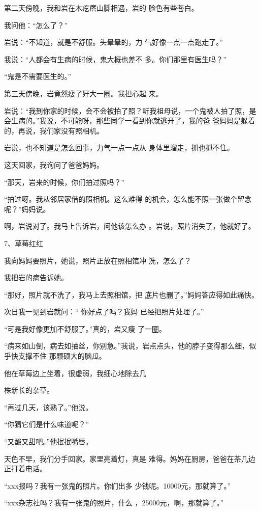 \documentclass{article}
\begin{document}
第二天傍晚，我和岩在木疙瘩山脚相遇，岩的
脸色有些苍白。 


我问他：“怎么了？” 

岩说：“不知道，就是不舒服。头晕晕的，力
气好像一点一点跑走了。” 

我说：“人都会有生病的时候，鬼大概也差不
多。你们那里有医生吗？” 


“鬼是不需要医生的。” 

\newpage

第三天傍晚，岩竟然瘦了好大一圈。我担心起
来。 

岩说：“我到你家的时候，会不会被拍了照？听我祖母说，一个鬼被人拍了照，是会生病的。”我说，不可能呀，那些同学一看到你就逃开了，我的爸
爸妈妈是躲着的，再说，我们家没有照相机。 

岩说，也不知道是怎么回事，力气一点一点从
身体里溜走，抓也抓不住。 


这天回家，我询问了爸爸妈妈。 


“那天，岩来的时候，你们拍过照吗？” 

“拍过呀。我从邻居家借的照相机。这么难得
的机会，怎么能不照一张做个留念呢？”妈妈说。 

啊，岩说对了。我马上告诉岩，问他该怎么办
。岩说，照片消失了，他就好了。 

\newpage


7、草莓红红 

我向妈妈要照片，她说，照片正放在照相馆冲
洗，怎么了？ 


我把岩的病告诉她。 

“那好，照片就不洗了，我马上去照相馆，把
底片也删了。”妈妈答应得如此痛快。 

次日我一见到岩就问：“ 你好点了吗？我妈
已经把照片处理了。” 

“可是我好像更加不舒服了。”真的，岩又瘦
了一圈。 

“病来如山倒，病去如抽丝，你别急。”我说，岩点点头，他的脖子变得那么细，似乎快支撑不住
那颗硕大的脑瓜。 

他在草莓边上坐着，很虚弱，我细心地除去几
\newpage

株新长的杂草。 


“再过几天，该熟了。”他说。 


“你猜它们是什么味道呢？” 


“又酸又甜吧。”他抿抿嘴唇。 

天色不早，我们分手回家。家里亮着灯，真是
难得。妈妈在厨房，爸爸在茶几边正打着电话。 

“xxx报吗？我有一张鬼的照片。你们出多
少钱呢。10000元，那就算了。” 

“xxx杂志社吗？我有一张鬼的照片，什么
，25000元，啊，那就算了。” 
\end{document}
